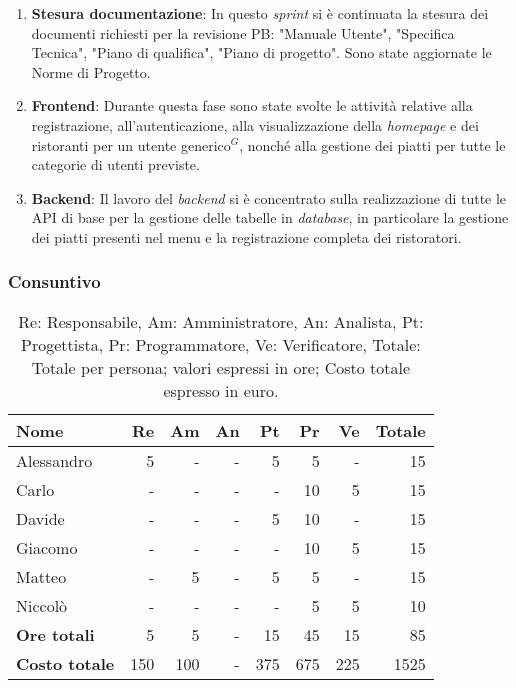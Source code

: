 \begin{enumerate}
	\item \textbf{Stesura documentazione}: In questo \textit{sprint} si è continuata la stesura dei documenti richiesti per la revisione PB: "Manuale Utente", "Specifica Tecnica", "Piano di qualifica", "Piano di progetto". Sono state aggiornate le Norme di Progetto.

	\item \textbf{Frontend}: Durante questa fase sono state svolte le attività relative alla registrazione, all'autenticazione, alla visualizzazione della \textit{homepage} e dei ristoranti per un utente generico$^G$, nonché alla gestione dei piatti per tutte le categorie di utenti previste.

	\item \textbf{Backend}: Il lavoro del \textit{backend} si è concentrato sulla realizzazione di tutte le API di base per la gestione delle tabelle in \textit{database}, in particolare la gestione dei piatti presenti nel menu e la registrazione completa dei ristoratori.
\end{enumerate}

\subsubsection{Consuntivo}
\begin{table}[H]
	\centering
	\begin{tabular}{l|r|r|r|r|r|r|r}
		\textbf{Nome}         & \textbf{Re} & \textbf{Am} & \textbf{An} & \textbf{Pt} & \textbf{Pr} & \textbf{Ve} & \textbf{Totale} \\
		\hline
		Alessandro            & 5           & -           & -           & 5           & 5           & -           & 15              \\
		Carlo                 & -           & -           & -           & -           & 10          & 5           & 15              \\
		Davide                & -           & -           & -           & 5           & 10          & -           & 15              \\
		Giacomo               & -           & -           & -           & -           & 10          & 5           & 15              \\
		Matteo                & -           & 5           & -           & 5           & 5           & -           & 15              \\
		Niccolò               & -           & -           & -           & -           & 5           & 5           & 10              \\
		\hline
		\textbf{Ore totali}   & 5           & 5           & -           & 15          & 45          & 15          & 85              \\
		\textbf{Costo totale} & 150         & 100         & -           & 375         & 675         & 225         & 1525
	\end{tabular}
	\caption{Re: Responsabile, Am: Amministratore, An: Analista, Pt: Progettista,
		Pr: Programmatore, Ve: Verificatore, Totale: Totale per persona; valori espressi in ore; Costo totale espresso in euro.}
\end{table}

